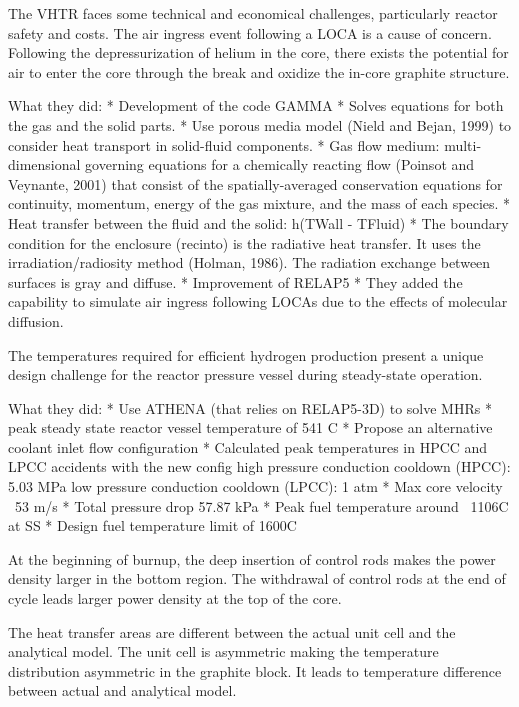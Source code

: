 The VHTR faces some technical and economical challenges, particularly reactor safety and costs.
The air ingress event following a LOCA is a cause of concern.
Following the depressurization of helium in the core, there exists the potential for air to enter the core through the break and oxidize the in-core graphite structure.

What they did:
* Development of the code GAMMA
* Solves equations for both the gas and the solid parts.
* Use porous media model (Nield and Bejan, 1999) to consider heat transport in solid-fluid components.
* Gas flow medium: multi-dimensional governing equations for a chemically reacting flow (Poinsot and Veynante,
2001) that consist of the spatially-averaged conservation equations for continuity, momentum, energy of the gas mixture, and the mass of each species.
* Heat transfer between the fluid and the solid: h(TWall - TFluid)
* The boundary condition for the enclosure (recinto) is the radiative heat transfer. It uses the irradiation/radiosity method (Holman, 1986). The radiation exchange between surfaces is gray and diffuse.
* Improvement of RELAP5
* They added the capability to simulate air ingress following LOCAs due to the effects of molecular diffusion.

The temperatures required for efficient hydrogen production present a unique design challenge for the reactor pressure vessel during steady-state operation.

What they did:
* Use ATHENA (that relies on RELAP5-3D) to solve MHRs
* peak steady state reactor vessel temperature of 541 C
* Propose an alternative coolant inlet flow configuration
* Calculated peak temperatures in HPCC and LPCC accidents with the new config
high pressure conduction cooldown (HPCC): 5.03 MPa
low pressure conduction cooldown (LPCC): 1 atm
* Max core velocity ~53 m/s
* Total pressure drop 57.87 kPa
* Peak fuel temperature around ~1106C at SS
* Design fuel temperature limit of 1600C

At the beginning of burnup, the deep insertion of control rods makes the power density larger in the bottom region.
The withdrawal of control rods at the end of cycle leads larger power density at the top of the core.

The heat transfer areas are different between the actual unit cell and the analytical model.
The unit cell is asymmetric making the temperature distribution asymmetric in the graphite block.
It leads to temperature difference between actual and analytical model.

